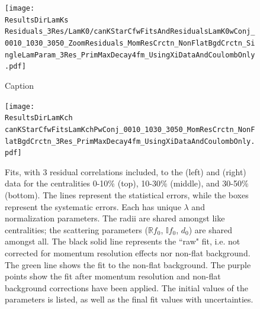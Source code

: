 \documentclass[../AnalysisNoteJBuxton.tex]{subfiles}
\begin{document}
\begin{figure}[h]
  \centering
  \texttt{[image: \\ResultsDirLamKs Residuals\_3Res/LamK0/canKStarCfwFitsAndResidualsLamK0wConj\_0010\_1030\_3050\_ZoomResiduals\_MomResCrctn\_NonFlatBgdCrctn\_SingleLamParam\_3Res\_PrimMaxDecay4fm\_UsingXiDataAndCoulombOnly.pdf]}
  \caption[Small Caption]{Caption}
  \label{fig:LamK0wConjFitsAndResiduals_3Res}
\end{figure}



\begin{figure}[h]
  \centering
  \texttt{[image: \\ResultsDirLamKch canKStarCfwFitsLamKchPwConj\_0010\_1030\_3050\_MomResCrctn\_NonFlatBgdCrctn\_3Res\_PrimMaxDecay4fm\_UsingXiDataAndCoulombOnly.pdf]}
  \caption[\LamKchPALamKchM Fits with 3 Residuals]{Fits, with 3 residual correlations included, to the \LamKchP (left) and \ALamKchM (right) data for the centralities 0-10\% (top), 10-30\% (middle), and 30-50\% (bottom).
The lines represent the statistical errors, while the boxes represent the systematic errors.  
Each has unique $\lambda$ and normalization parameters.
The radii are shared amongst like centralities; the scattering parameters ($\mathbb{R}f_{0}$, $\mathbb{I}f_{0}$, $d_{0}$) are shared amongst all.
The black solid line represents the ``raw" fit, i.e. not corrected for momentum resolution effects nor non-flat background.  
The green line shows the fit to the non-flat background.
The purple points show the fit after momentum resolution and non-flat background corrections have been applied.
The initial values of the parameters is listed, as well as the final fit values with uncertainties.}
  \label{fig:LamKchPwConjFits_3Res}
\end{figure}
\end{document}

